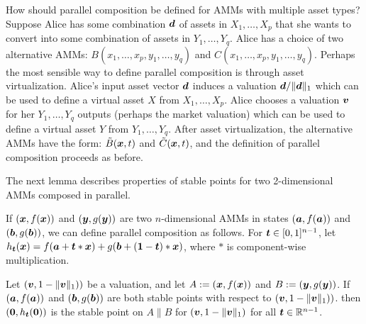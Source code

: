 How should parallel composition be defined for AMMs with multiple asset types?
Suppose Alice has some combination ${\boldsymbol d}$ of assets in $X_1,\ldots,X_p$
that she wants to convert into some combination of assets in $Y_1,\ldots,Y_q$.
Alice has a choice of two alternative AMMs:
$B(x_1,\ldots,x_p,y_1,\ldots,y_q)$ and $C(x_1,\ldots,x_p,y_1,\ldots,y_q)$.
Perhaps the most sensible way to define parallel composition is through
asset virtualization.
Alice's input asset vector ${\boldsymbol d}$ induces a valuation ${\boldsymbol d}/ \|{\boldsymbol d}\|_1$
which can be used to define a virtual asset $X$ from $X_1,\ldots,X_p$.
Alice chooses a valuation ${\boldsymbol v}$ for her $Y_1,\ldots,Y_q$ outputs
(perhaps the market valuation)
which can be used to define a virtual asset $Y$ from $Y_1,\ldots,Y_q$.
After asset virtualization, the alternative AMMs have the form:
$\tilde{B}({\boldsymbol x},t)$ and $\tilde{C}({\boldsymbol x},t)$,
and the definition of parallel composition proceeds as before.

The next lemma describes properties of stable points for two 2-dimensional AMMs composed in parallel.

If $({\boldsymbol x},f({\boldsymbol x}))$ and $({\boldsymbol y},g({\boldsymbol y}))$ are two $n$-dimensional AMMs in states $({\boldsymbol a},f({\boldsymbol a}))$ and $({\boldsymbol b},g({\boldsymbol b}))$,
we can define parallel composition as follows.
For ${\boldsymbol t} \in [0,1]^{n-1}$,
let $h_{{\boldsymbol t}}({\boldsymbol x}) = f({\boldsymbol a} + {\boldsymbol t} * {\boldsymbol x}) + g({\boldsymbol b} + ({\boldsymbol 1} - {\boldsymbol t} )* {\boldsymbol x})$,
where $*$ is component-wise multiplication.

\begin{lemma}
  Let $({\boldsymbol v},1-\|{\boldsymbol v}\|_1))$ be a valuation,
  and let $A := ({\boldsymbol x},f({\boldsymbol x}))$ and $B := ({\boldsymbol y},g({\boldsymbol y}))$.
  If $({\boldsymbol a},f({\boldsymbol a}))$ and $({\boldsymbol b},g({\boldsymbol b}))$ are both stable points with respect to $({\boldsymbol v},1-\|{\boldsymbol v}\|_1))$.
  then $({\boldsymbol 0},h_{{\boldsymbol t}}({\boldsymbol 0}))$ is the stable point on $A \| B$  for $({\boldsymbol v},1-\|{\boldsymbol v}\|_1)$
  for all ${\boldsymbol t} \in \mathbb{R}^{n-1}$.
  \end{lemma}

